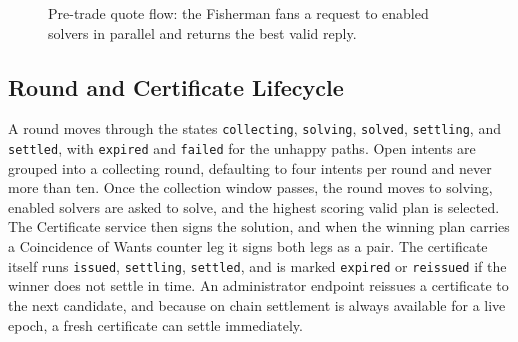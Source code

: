 \documentclass[10pt,sigconf,nonacm]{acmart}
\theoremstyle{reiythm}
\begin{document}
\begin{figure}[htbp]
  \centering
  \caption{Pre-trade quote flow: the Fisherman fans a request to enabled solvers
    in parallel and returns the best valid reply.}
  \label{fig:quote}
\end{figure}

\subsection{Round and Certificate Lifecycle}

A round moves through the states \texttt{collecting}, \texttt{solving},
\texttt{solved}, \texttt{settling}, and \texttt{settled}, with \texttt{expired}
and \texttt{failed} for the unhappy paths. Open intents are grouped into a
collecting round, defaulting to four intents per round and never more than ten.
Once the collection window passes, the round moves to solving, enabled solvers are
asked to solve, and the highest scoring valid plan is selected. The Certificate
service then signs the solution, and when the winning plan carries a Coincidence
of Wants counter leg it signs both legs as a pair. The certificate itself runs
\texttt{issued}, \texttt{settling}, \texttt{settled}, and is marked
\texttt{expired} or \texttt{reissued} if the winner does not settle in time. An
administrator endpoint reissues a certificate to the next candidate, and because
on chain settlement is always available for a live epoch, a fresh certificate can
settle immediately.
\end{document}
